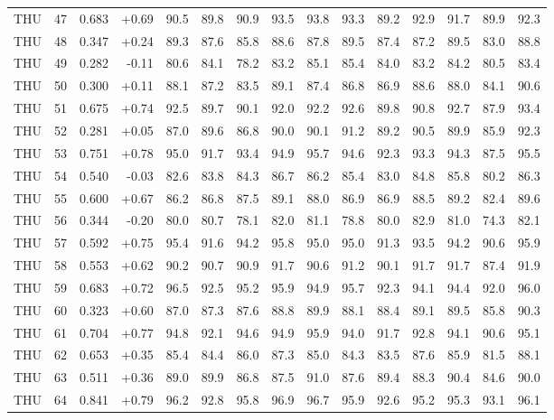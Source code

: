 \begin{longtable}{@{}llrrrrrrrrrrrrr@{}}
THU & 47 & 0.683 & +0.69 & 90.5 & 89.8 & 90.9 & 93.5 & 93.8 & 93.3 & 89.2 & 92.9 & 91.7 & 89.9 & 92.3 \\
THU & 48 & 0.347 & +0.24 & 89.3 & 87.6 & 85.8 & 88.6 & 87.8 & 89.5 & 87.4 & 87.2 & 89.5 & 83.0 & 88.8 \\
THU & 49 & 0.282 & -0.11 & 80.6 & 84.1 & 78.2 & 83.2 & 85.1 & 85.4 & 84.0 & 83.2 & 84.2 & 80.5 & 83.4 \\
THU & 50 & 0.300 & +0.11 & 88.1 & 87.2 & 83.5 & 89.1 & 87.4 & 86.8 & 86.9 & 88.6 & 88.0 & 84.1 & 90.6 \\
THU & 51 & 0.675 & +0.74 & 92.5 & 89.7 & 90.1 & 92.0 & 92.2 & 92.6 & 89.8 & 90.8 & 92.7 & 87.9 & 93.4 \\
THU & 52 & 0.281 & +0.05 & 87.0 & 89.6 & 86.8 & 90.0 & 90.1 & 91.2 & 89.2 & 90.5 & 89.9 & 85.9 & 92.3 \\
THU & 53 & 0.751 & +0.78 & 95.0 & 91.7 & 93.4 & 94.9 & 95.7 & 94.6 & 92.3 & 93.3 & 94.3 & 87.5 & 95.5 \\
THU & 54 & 0.540 & -0.03 & 82.6 & 83.8 & 84.3 & 86.7 & 86.2 & 85.4 & 83.0 & 84.8 & 85.8 & 80.2 & 86.3 \\
THU & 55 & 0.600 & +0.67 & 86.2 & 86.8 & 87.5 & 89.1 & 88.0 & 86.9 & 86.9 & 88.5 & 89.2 & 82.4 & 89.6 \\
THU & 56 & 0.344 & -0.20 & 80.0 & 80.7 & 78.1 & 82.0 & 81.1 & 78.8 & 80.0 & 82.9 & 81.0 & 74.3 & 82.1 \\
THU & 57 & 0.592 & +0.75 & 95.4 & 91.6 & 94.2 & 95.8 & 95.0 & 95.0 & 91.3 & 93.5 & 94.2 & 90.6 & 95.9 \\
THU & 58 & 0.553 & +0.62 & 90.2 & 90.7 & 90.9 & 91.7 & 90.6 & 91.2 & 90.1 & 91.7 & 91.7 & 87.4 & 91.9 \\
THU & 59 & 0.683 & +0.72 & 96.5 & 92.5 & 95.2 & 95.9 & 94.9 & 95.7 & 92.3 & 94.1 & 94.4 & 92.0 & 96.0 \\
THU & 60 & 0.323 & +0.60 & 87.0 & 87.3 & 87.6 & 88.8 & 89.9 & 88.1 & 88.4 & 89.1 & 89.5 & 85.8 & 90.3 \\
THU & 61 & 0.704 & +0.77 & 94.8 & 92.1 & 94.6 & 94.9 & 95.9 & 94.0 & 91.7 & 92.8 & 94.1 & 90.6 & 95.1 \\
THU & 62 & 0.653 & +0.35 & 85.4 & 84.4 & 86.0 & 87.3 & 85.0 & 84.3 & 83.5 & 87.6 & 85.9 & 81.5 & 88.1 \\
THU & 63 & 0.511 & +0.36 & 89.0 & 89.9 & 86.8 & 87.5 & 91.0 & 87.6 & 89.4 & 88.3 & 90.4 & 84.6 & 90.0 \\
THU & 64 & 0.841 & +0.79 & 96.2 & 92.8 & 95.8 & 96.9 & 96.7 & 95.9 & 92.6 & 95.2 & 95.3 & 93.1 & 96.1 \\

\end{longtable}
